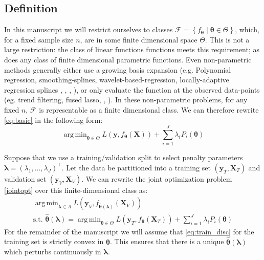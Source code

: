 \documentclass[12pt,letterpaper]{article}
\DeclareMathOperator*{\argmin}{arg\,min}
\begin{document}
\subsection{Definition}
In this manuscript we will restrict ourselves to classes $\mathcal{F} = \left\{f_{\boldsymbol \theta}\middle| \boldsymbol \theta\in\Theta\right\}$, which, for a fixed sample size $n$, are in some finite dimensional space $\Theta$. This is not a large restriction: the class of linear functions functions meets this requirement; as does any class of finite dimensional parametric functions. Even non-parametric methods generally either use a growing basis expansion (e.g. Polynomial regression, smoothing-splines, wavelet-based-regression, locally-adaptive regression splines \citep{tsybakov2008introduction}, \citep{wahba1981spline}, \citep{donoho1994ideal}, \citep{mammen1997locally}), or only evaluate the function at the observed data-points (eg. trend filtering, fused lasso, \citep{kim2009ell_1}, \citep{tibshirani2005sparsity}). In these non-parametric problems, for any fixed $n$, $\mathcal{F}$ is representable as a finite dimensional class.
We can therefore rewrite \eqref{eq:basic} in the following form:
\begin{equation}\label{eq:train_disc}
\argmin_{\boldsymbol \theta \in \Theta} L(\boldsymbol{y}, f_{\boldsymbol \theta}(\boldsymbol{X})) + \sum\limits_{i=1}^J \lambda_i P_i(\boldsymbol \theta)
\end{equation}

Suppose that we use a training/validation split to select penalty parameters $\boldsymbol{\lambda} = (\lambda_1, ..., \lambda_J)^\top$. Let the data be partitioned into a training set $(\boldsymbol{y}_T , \boldsymbol{X}_T)$ and validation set $(\boldsymbol{y}_V, \boldsymbol{X}_V)$. We can rewrite the joint optimization problem \eqref{jointopt} over this finite-dimensional class as:
\begin{equation}
\begin{array}{c}
\argmin_{\boldsymbol{\lambda} \in \Lambda} L(\boldsymbol{y}_V, f_{\hat{\boldsymbol \theta}(\boldsymbol{\lambda})}(\boldsymbol{X}_V)) \\
\text{s.t. } {\hat{\boldsymbol \theta}(\boldsymbol{\lambda})} = \argmin_{\boldsymbol \theta \in \Theta} L(\boldsymbol{y}_T, f_{\boldsymbol \theta} (\boldsymbol{X}_T)) + \sum\limits_{i=1}^J \lambda_i P_i(\boldsymbol \theta)
\end{array}
\label{jointopt2}
\end{equation}
For the remainder of the manuscript we will assume that \eqref{eq:train_disc} for the training set is strictly convex in $\boldsymbol \theta$. This ensures that there is a unique $\hat{\boldsymbol \theta}(\boldsymbol{\lambda})$ which perturbs continuously in $\boldsymbol{\lambda}$.
\end{document}
